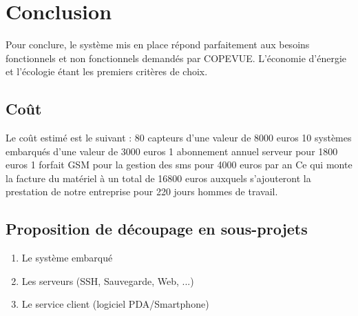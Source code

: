 \section{Conclusion}

Pour conclure, le système mis en place répond parfaitement aux besoins 
fonctionnels et non fonctionnels demandés par COPEVUE. L'économie d'énergie et 
l'écologie étant les premiers critères de choix.

\subsection{Coût}

Le coût estimé est le suivant :
80 capteurs d'une valeur de 8000 euros
10 systèmes embarqués d'une valeur de 3000 euros
1 abonnement annuel serveur pour 1800 euros
1 forfait GSM pour la gestion des sms pour 4000 euros par an
Ce qui monte la facture du matériel à un total de 16800 euros auxquels 
s'ajouteront la prestation de notre entreprise pour 220 jours hommes de travail.

\subsection{Proposition de découpage en sous-projets}

\begin{enumerate}
\item Le système embarqué
\item Les serveurs (SSH, Sauvegarde, Web, ...)
\item Le service client (logiciel PDA/Smartphone) 
\end {enumerate}

